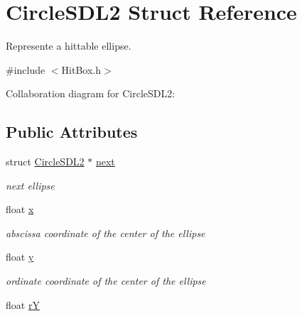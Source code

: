 \hypertarget{structCircleSDL2}{}\section{Circle\+S\+D\+L2 Struct Reference}
\label{structCircleSDL2}


Represente a hittable ellipse.  




{\ttfamily \#include $<$Hit\+Box.\+h$>$}



Collaboration diagram for Circle\+S\+D\+L2\+:
\subsection*{Public Attributes}
\begin{DoxyCompactItemize}
\item 
struct \hyperlink{structCircleSDL2}{Circle\+S\+D\+L2} $\ast$ \hyperlink{structCircleSDL2_ac39c89f7e034b21161bbacf6e4a2c1ea}{next}\hypertarget{structCircleSDL2_ac39c89f7e034b21161bbacf6e4a2c1ea}{}\label{structCircleSDL2_ac39c89f7e034b21161bbacf6e4a2c1ea}

\begin{DoxyCompactList}\small\item\em next ellipse \end{DoxyCompactList}\item 
float \hyperlink{structCircleSDL2_ad235379713c16cff4df569ebd818aa4e}{x}\hypertarget{structCircleSDL2_ad235379713c16cff4df569ebd818aa4e}{}\label{structCircleSDL2_ad235379713c16cff4df569ebd818aa4e}

\begin{DoxyCompactList}\small\item\em abscissa coordinate of the center of the ellipse \end{DoxyCompactList}\item 
float \hyperlink{structCircleSDL2_a52d1cb29f05a93e3f127e1956a9714ec}{y}\hypertarget{structCircleSDL2_a52d1cb29f05a93e3f127e1956a9714ec}{}\label{structCircleSDL2_a52d1cb29f05a93e3f127e1956a9714ec}

\begin{DoxyCompactList}\small\item\em ordinate coordinate of the center of the ellipse \end{DoxyCompactList}\item 
float \hyperlink{structCircleSDL2_a5efd23d10522c9e2876ee3680bd9d73a}{rY}\hypertarget{structCircleSDL2_a5efd23d10522c9e2876ee3680bd9d73a}{}\label{structCircleSDL2_a5efd23d10522c9e2876ee3680bd9d73a}


\end{DoxyCompactItemize}
